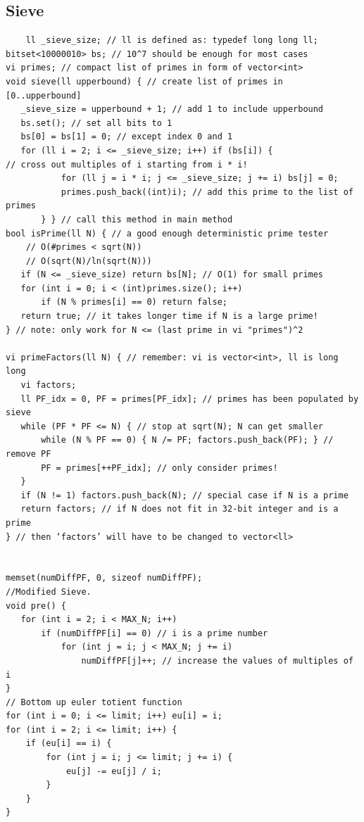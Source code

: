 \documentclass[8pt, a4paper, oneside, twocolumn]{extarticle}
\begin{document}
\subsection{Sieve}
\begin{verbatim}
    ll _sieve_size; // ll is defined as: typedef long long ll;
bitset<10000010> bs; // 10^7 should be enough for most cases
vi primes; // compact list of primes in form of vector<int>
void sieve(ll upperbound) { // create list of primes in [0..upperbound]
   _sieve_size = upperbound + 1; // add 1 to include upperbound
   bs.set(); // set all bits to 1
   bs[0] = bs[1] = 0; // except index 0 and 1
   for (ll i = 2; i <= _sieve_size; i++) if (bs[i]) {
// cross out multiples of i starting from i * i!
           for (ll j = i * i; j <= _sieve_size; j += i) bs[j] = 0;
           primes.push_back((int)i); // add this prime to the list of primes
       } } // call this method in main method
bool isPrime(ll N) { // a good enough deterministic prime tester
    // O(#primes < sqrt(N))
    // O(sqrt(N)/ln(sqrt(N)))
   if (N <= _sieve_size) return bs[N]; // O(1) for small primes
   for (int i = 0; i < (int)primes.size(); i++)
       if (N % primes[i] == 0) return false;
   return true; // it takes longer time if N is a large prime!
} // note: only work for N <= (last prime in vi "primes")^2

vi primeFactors(ll N) { // remember: vi is vector<int>, ll is long long
   vi factors;
   ll PF_idx = 0, PF = primes[PF_idx]; // primes has been populated by sieve
   while (PF * PF <= N) { // stop at sqrt(N); N can get smaller
       while (N % PF == 0) { N /= PF; factors.push_back(PF); } // remove PF
       PF = primes[++PF_idx]; // only consider primes!
   }
   if (N != 1) factors.push_back(N); // special case if N is a prime
   return factors; // if N does not fit in 32-bit integer and is a prime
} // then ‘factors’ will have to be changed to vector<ll>


memset(numDiffPF, 0, sizeof numDiffPF);
//Modified Sieve.
void pre() {
   for (int i = 2; i < MAX_N; i++)
       if (numDiffPF[i] == 0) // i is a prime number
           for (int j = i; j < MAX_N; j += i)
               numDiffPF[j]++; // increase the values of multiples of i
}
// Bottom up euler totient function
for (int i = 0; i <= limit; i++) eu[i] = i;
for (int i = 2; i <= limit; i++) {
    if (eu[i] == i) {
        for (int j = i; j <= limit; j += i) {
            eu[j] -= eu[j] / i;
        }
    }
}
\end{verbatim}
\end{document}
